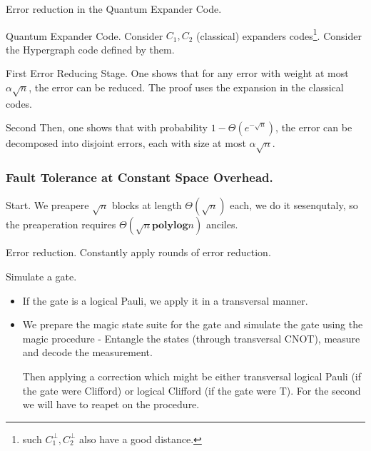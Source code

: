 \documentclass{beamer}
\begin{document}
\begin{frame}{Error reduction in the Quantum Expander Code.}
  \begin{block}{Quantum Expander Code.}
    Consider $C_{1},C_{2}$ (classical) expanders codes\footnote{such $C_{1}^{\perp}, C_{2}^{\perp}$ also have a good distance.}. Consider the Hypergraph code defined by them.
  \end{block}


  \begin{block}{First}
  Error  Reducing Stage. One shows that for any error with weight at most $\alpha \sqrt{n}$, the error can be reduced. The proof uses the expansion in the classical codes.
\end{block}

\begin{block}{Second}
  Then, one shows that with probability $1 - \Theta(e^{-\sqrt{n}})$, the error can be decomposed into disjoint errors, each with size at most $\alpha \sqrt{n}$.
  \end{block} 
\end{frame}


\begin{frame}
  \frametitle{Fault Tolerance at Constant Space Overhead.}

  \begin{block}{Start.}
    We preapere $\sqrt{n}$ blocks at length $\Theta(\sqrt{n})$ each, we do it sesenqutaly, so the preaperation requires $\Theta(\sqrt{n} \mathbf{ poly log} n)$ anciles. 
  \end{block}
 
  \begin{block}{Error reduction.}
Constantly apply rounds of error reduction.
  \end{block}
  \begin{block}{Simulate a gate.}
    \begin{itemize}
      \item  If the gate is a logical Pauli, we apply it in a transversal manner.
      \item We prepare the magic state suite for the gate and simulate the gate using the magic procedure - Entangle the states (through transversal CNOT), measure and decode the measurement. 

        Then applying a correction which might be either transversal logical Pauli (if the gate were Clifford) or logical Clifford (if the gate were T). For the second we will have to reapet on the procedure. 
    \end{itemize}
  \end{block}


\end{frame}
\end{document}
